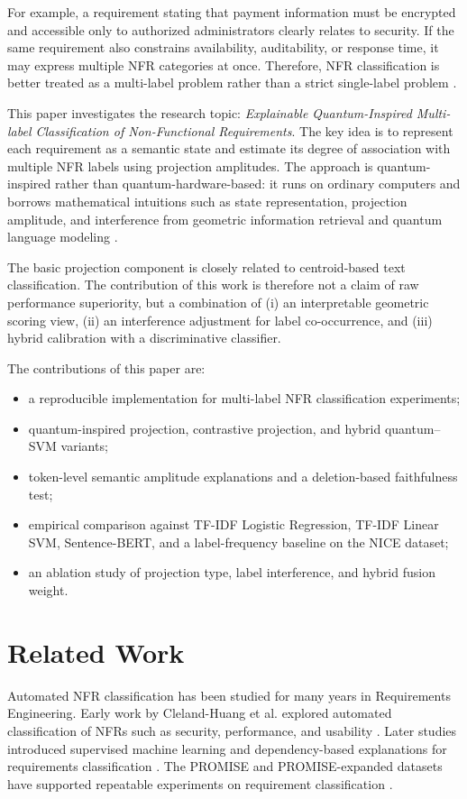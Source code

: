 \documentclass[runningheads]{llncs}
\begin{document}
For example, a requirement stating that payment information must be encrypted
and accessible only to authorized administrators clearly relates to security. If
the same requirement also constrains availability, auditability, or response
time, it may express multiple NFR categories at once. Therefore, NFR
classification is better treated as a multi-label problem rather than a strict
single-label problem \cite{tsoumakas2007multilabel,zhang2014review}.

This paper investigates the research topic: \emph{Explainable Quantum-Inspired
Multi-label Classification of Non-Functional Requirements}. The key idea is to
represent each requirement as a semantic state and estimate its degree of
association with multiple NFR labels using projection amplitudes. The approach
is quantum-inspired rather than quantum-hardware-based: it runs on ordinary
computers and borrows mathematical intuitions such as state representation,
projection amplitude, and interference from geometric information retrieval and
quantum language modeling \cite{vanrijsbergen2004geometry,sordoni2013quantum,li2019cnm}.

The basic projection component is closely related to centroid-based text
classification. The contribution of this work is therefore not a claim of raw
performance superiority, but a combination of (i) an interpretable geometric
scoring view, (ii) an interference adjustment for label co-occurrence, and
(iii) hybrid calibration with a discriminative classifier.

The contributions of this paper are:
\begin{itemize}
    \item a reproducible implementation for multi-label NFR classification experiments;
    \item quantum-inspired projection, contrastive projection, and hybrid quantum--SVM variants;
    \item token-level semantic amplitude explanations and a deletion-based faithfulness test;
    \item empirical comparison against TF-IDF Logistic Regression, TF-IDF Linear SVM, Sentence-BERT, and a label-frequency baseline on the NICE dataset;
    \item an ablation study of projection type, label interference, and hybrid fusion weight.
\end{itemize}

\section{Related Work}
Automated NFR classification has been studied for many years in Requirements
Engineering. Early work by Cleland-Huang et al. explored automated
classification of NFRs such as security, performance, and usability
\cite{clelandhuang2007automated}. Later studies introduced supervised machine
learning and dependency-based explanations for requirements classification
\cite{kurtanovic2017automatically,dalpiaz2019requirements}. The PROMISE and
PROMISE-expanded datasets have supported repeatable experiments on requirement
classification \cite{mitrevski_promise_exp}.
\end{document}
